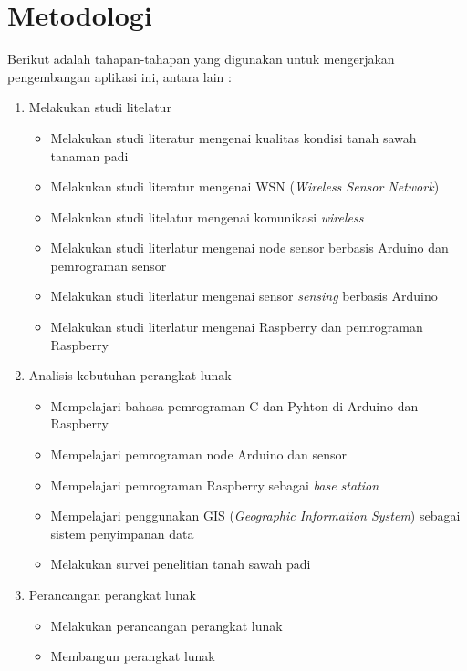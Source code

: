 \section{Metodologi}
\label{sec:metlit}
Berikut adalah tahapan-tahapan yang digunakan untuk mengerjakan pengembangan aplikasi ini, antara lain :
\begin{enumerate}
		\item Melakukan studi litelatur
	        \begin{itemize}
	            \item Melakukan studi literatur mengenai kualitas kondisi tanah sawah tanaman padi
	            \item Melakukan studi literatur mengenai WSN (\textit{Wireless Sensor Network})
	            \item Melakukan studi litelatur mengenai komunikasi \textit{wireless}
	            \item Melakukan studi literlatur mengenai node sensor berbasis Arduino dan pemrograman sensor
	            \item Melakukan studi literlatur mengenai sensor \textit{sensing} berbasis Arduino 
	            \item Melakukan studi literlatur mengenai Raspberry dan pemrograman Raspberry
	        \end{itemize}
	        
	    \item Analisis kebutuhan perangkat lunak
	    \begin{itemize}
	        \item Mempelajari bahasa pemrograman C dan Pyhton di Arduino dan Raspberry
	        \item Mempelajari pemrograman node Arduino dan sensor
	        \item Mempelajari pemrograman Raspberry sebagai \textit{base station}
            \item Mempelajari penggunakan GIS (\textit{Geographic Information System}) sebagai sistem penyimpanan data
            \item Melakukan survei penelitian tanah sawah padi
	    \end{itemize}
	    
        \item Perancangan perangkat lunak
        \begin{itemize}
            \item Melakukan perancangan perangkat lunak
		    \item Membangun perangkat lunak
        \end{itemize}
        

\end{enumerate}
